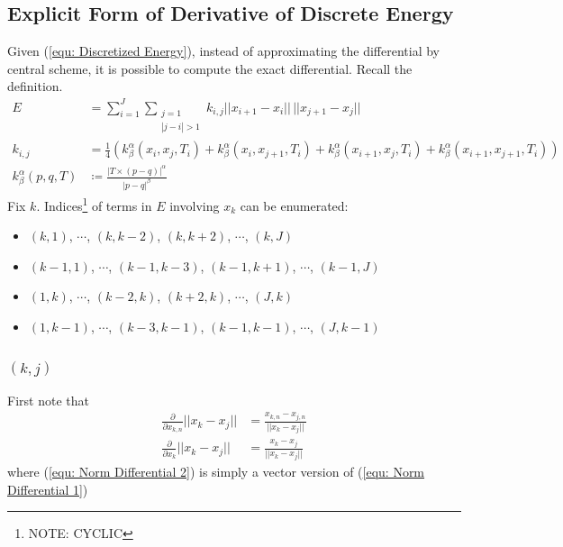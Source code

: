 \documentclass[a4paper, 11pt]{article}
\newcommand{\norm}[1]{||#1||}
\theoremstyle{definition}
\theoremstyle{remark}
\begin{document}
\subsection{Explicit Form of Derivative of Discrete Energy}
Given (\ref{equ: Discretized Energy}), instead of approximating the differential by central scheme,
it is possible to compute the exact differential.
Recall the definition.
\begin{align}
    E &= \sum_{i = 1}^{J} \sum_{\substack{j = 1 \\ |j-i| > 1}} k_{i,j} \norm{x_{i+1} - x_i} \, \norm{x_{j+1} - x_j} 
    \\
    k_{i,j} &= \frac{1}{4} \left( 
        k_{\beta}^{\alpha} \left( x_i, x_j, T_i \right)
        + k_{\beta}^{\alpha} \left( x_i, x_{j+1}, T_i \right)
        + k_{\beta}^{\alpha} \left( x_{i+1}, x_j, T_i \right)
        + k_{\beta}^{\alpha} \left( x_{i+1}, x_{j+1}, T_i \right)
    \right)
    \\
    k_{\beta}^{\alpha} \left( p, q, T \right) &\coloneqq \frac{|T \times \left( p-q \right)|^\alpha}{|p-q|^{\beta}}
\end{align}
Fix $k$. Indices\footnote{NOTE: CYCLIC} of terms in $E$ involving $x_k$ can be enumerated:
\begin{itemize}
    \item $(k,1)$, $\cdots$, $(k, k-2)$, $(k, k+2)$, $\cdots$, $(k,J)$
    \item $(k-1,1)$, $\cdots$, $(k-1, k-3)$, $(k-1, k+1)$, $\cdots$, $(k-1,J)$
    \item $(1,k)$, $\cdots$, $(k-2, k)$, $(k+2, k)$, $\cdots$, $(J,k)$
    \item $(1,k-1)$, $\cdots$, $(k-3, k-1)$, $(k-1, k-1)$, $\cdots$, $(J,k-1)$
\end{itemize}

\subsubsection{$(k, j)$}
First note that 
\begin{align}
    \frac{\partial}{\partial x_{k,n}} \norm{x_k - x_{j}} &= \frac{x_{k,n} - x_{j,n}}{\norm{x_k - x_{j}}}
    \label{equ: Norm Differential 1} \\
    \frac{\partial}{\partial x_k} \norm{x_k - x_{j}} &= \frac{x_k - x_{j}}{\norm{x_k - x_{j}}}
    \label{equ: Norm Differential 2}
\end{align}
where (\ref{equ: Norm Differential 2}) is simply a vector version of (\ref{equ: Norm Differential 1})
\end{document}
